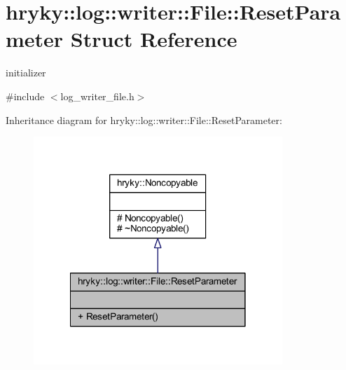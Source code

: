 \hypertarget{structhryky_1_1log_1_1writer_1_1_file_1_1_reset_parameter}{\section{hryky\-:\-:log\-:\-:writer\-:\-:File\-:\-:Reset\-Parameter Struct Reference}
\label{structhryky_1_1log_1_1writer_1_1_file_1_1_reset_parameter}
}


initializer  




{\ttfamily \#include $<$log\-\_\-writer\-\_\-file.\-h$>$}



Inheritance diagram for hryky\-:\-:log\-:\-:writer\-:\-:File\-:\-:Reset\-Parameter\-:\nopagebreak
\begin{figure}[H]
\begin{center}
\leavevmode
\includegraphics[width=266pt]{structhryky_1_1log_1_1writer_1_1_file_1_1_reset_parameter__inherit__graph}
\end{center}
\end{figure}
